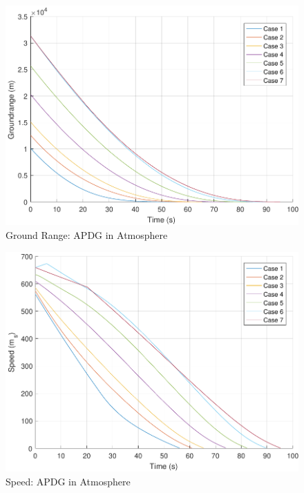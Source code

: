 \begin{figure}[H]
	\centering
	\begin{minipage}{4.3 in}
		\includegraphics[width=\linewidth]{Figures/rngpowatmo.pdf}
		\caption{Ground Range: APDG in Atmosphere \label{fig:rngpowatmo} }
	\end{minipage}
\end{figure}

\begin{figure}[H]
	\centering
	\begin{minipage}{4.3 in}
		\includegraphics[width=\linewidth]{Figures/spdpowatmo.pdf}
		\caption{Speed: APDG in Atmosphere \label{fig:spdpowatmo} }
	\end{minipage}
\end{figure}

